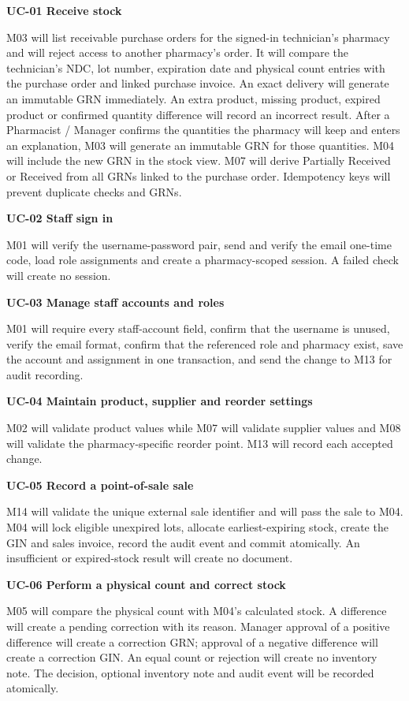 \textbf{UC-01 Receive stock}

M03 will list receivable purchase orders for the signed-in technician's pharmacy and will reject access to another pharmacy's order. It will compare the technician's NDC, lot number, expiration date and physical count entries with the purchase order and linked purchase invoice. An exact delivery will generate an immutable GRN immediately. An extra product, missing product, expired product or confirmed quantity difference will record an incorrect result. After a Pharmacist / Manager confirms the quantities the pharmacy will keep and enters an explanation, M03 will generate an immutable GRN for those quantities. M04 will include the new GRN in the stock view. M07 will derive Partially Received or Received from all GRNs linked to the purchase order. Idempotency keys will prevent duplicate checks and GRNs.

\textbf{UC-02 Staff sign in}

M01 will verify the username-password pair, send and verify the email one-time code, load role assignments and create a pharmacy-scoped session. A failed check will create no session.

\textbf{UC-03 Manage staff accounts and roles}

M01 will require every staff-account field, confirm that the username is unused, verify the email format, confirm that the referenced role and pharmacy exist, save the account and assignment in one transaction, and send the change to M13 for audit recording.

\textbf{UC-04 Maintain product, supplier and reorder settings}

M02 will validate product values while M07 will validate supplier values and M08 will validate the pharmacy-specific reorder point. M13 will record each accepted change.

\textbf{UC-05 Record a point-of-sale sale}

M14 will validate the unique external sale identifier and will pass the sale to M04. M04 will lock eligible unexpired lots, allocate earliest-expiring stock, create the GIN and sales invoice, record the audit event and commit atomically. An insufficient or expired-stock result will create no document.

\textbf{UC-06 Perform a physical count and correct stock}

M05 will compare the physical count with M04's calculated stock. A difference will create a pending correction with its reason. Manager approval of a positive difference will create a correction GRN; approval of a negative difference will create a correction GIN. An equal count or rejection will create no inventory note. The decision, optional inventory note and audit event will be recorded atomically.

